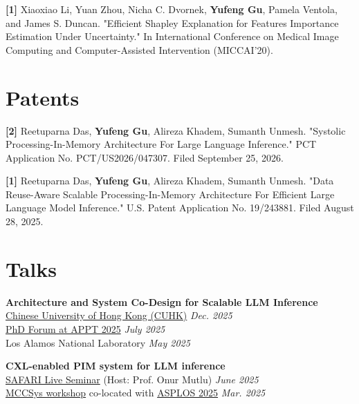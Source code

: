 \documentclass[10pt,a4paper,palatine]{moderncv}        %
\begin{document}
\textbf{[1]} Xiaoxiao Li, Yuan Zhou, Nicha C. Dvornek, \textbf{Yufeng Gu}, Pamela Ventola, and James S. Duncan. "Efficient Shapley Explanation for Features Importance Estimation Under Uncertainty." In International Conference on Medical Image Computing and Computer-Assisted Intervention (MICCAI'20).


\section{Patents}
\vspace{-2mm}

\textbf{[2]} Reetuparna Das, \textbf{Yufeng Gu}, Alireza Khadem, Sumanth Unmesh. "Systolic Processing-In-Memory Architecture For Large Language Inference." PCT Application No. PCT/US2026/047307. Filed September 25, 2026.

\textbf{[1]} Reetuparna Das, \textbf{Yufeng Gu}, Alireza Khadem, Sumanth Unmesh. "Data Reuse-Aware Scalable Processing-In-Memory Architecture For Efficient Large Language Model Inference." U.S. Patent Application No. 19/243881. Filed August 28, 2025.

\section{Talks}
\vspace{-2mm}

\textbf{Architecture and System Co-Design for Scalable LLM Inference} \\
\href{https://www.cse.cuhk.edu.hk/upcoming-events/architecture-and-system-co-design-for-scalable-large-language-model-inference/}{Chinese University of Hong Kong (CUHK)} \hfill {\itshape Dec. 2025} \\
\href{https://www.appt-conference.com/parallel-events/phd-forum}{PhD Forum at APPT 2025} \hfill {\itshape July 2025} \\
Los Alamos National Laboratory \hfill {\itshape May 2025} \\
\vspace{-6mm}



\textbf{CXL-enabled PIM system for LLM inference} \\
\href{https://safari.ethz.ch/safari-live-seminar-yufeng-gu-june-5-2025/}{SAFARI Live Seminar} (Host: Prof. Onur Mutlu) \hfill {\itshape June 2025} \\
\href{https://events.safari.ethz.ch/asplos25-MCCSys/doku.php}{MCCSys workshop} co-located with \href{https://www.asplos-conference.org/asplos2025/}{ASPLOS 2025} \hfill {\itshape Mar. 2025} \\
\vspace{-6mm}
\end{document}
